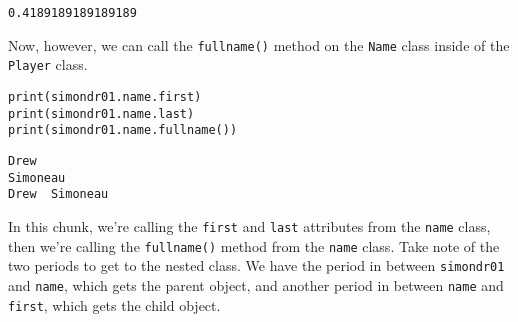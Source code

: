 \begin{lstlisting}[style=none]
0.4189189189189189
\end{lstlisting}
Now, however, we can call the \verb|fullname()| method on the \verb|Name| class inside of the \verb|Player| class.
\begin{lstlisting}[style=pippython]
print(simondr01.name.first)
print(simondr01.name.last)
print(simondr01.name.fullname())
\end{lstlisting}
\begin{lstlisting}[style=none]
Drew
Simoneau
Drew  Simoneau
\end{lstlisting}
In this chunk, we're calling the \verb|first| and \verb|last| attributes from the \verb|name| class, then we're calling the \verb|fullname()| method from the \verb|name| class. Take note of the two periods to get to the nested class. We have the period in between \verb|simondr01| and \verb|name|, which gets the parent object, and another period in between \verb|name| and \verb|first|, which gets the child object.
